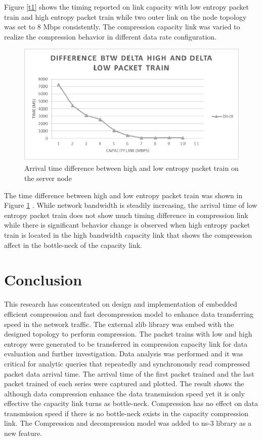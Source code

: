 \documentclass[sigconf]{acmart}
\begin{document}
Figure \ref{t1} shows the timing reported on link capacity with low entropy packet train and high entropy packet train while two outer link on the node topology was set to 8 Mbps consistently. The compression capacity link was varied to realize the compression behavior in different data rate configuration. 

 \begin{figure}[h]
  \centering
  \includegraphics[width=\linewidth]{3}
  \caption{Arrival time difference between high and low entropy packet train on the server node }
  \label{t2}
\end{figure} 

The time difference between high and low entropy packet train was shown in Figure \ref{t2} . While network bandwidth is steadily increasing, the arrival time of low entropy packet train does not show much timing difference in compression link while there is significant behavior change is observed when high entropy packet train is located in the high bandwidth capacity link that shows the compression affect in the bottle-neck of the capacity link. 

\section{Conclusion}
This research has concentrated on design and implementation of  embedded efficient compression and fast decompression model to enhance data transferring speed in the network traffic. The external zlib library was embed with the designed topology to perform compression. The packet trains with low and high entropy were generated to be transferred in compression capacity link for data evaluation and further investigation. Data analysis was performed and it was critical for analytic queries that repeatedly and synchronously read compressed packet data arrival time. The arrival time of the first packet trained and the last packet trained of each series were captured and plotted. The result shows the although data compression enhance the data transmission speed yet it is only effective the capacity link turns as bottle-neck. Compression has no effect on data transmission speed if there is no bottle-neck exists in the capacity compression link. The Compression and decompression model was added to ns-3 library as a new feature. 





\end{document}
